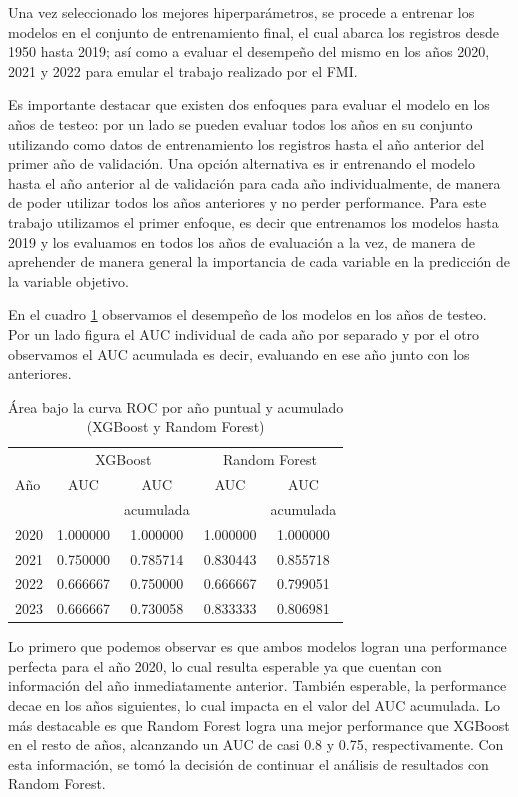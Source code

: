 \documentclass{article}
\begin{document}
Una vez seleccionado los mejores hiperparámetros, se procede a entrenar los modelos en el
conjunto de entrenamiento final, el cual abarca los registros desde 1950 hasta 2019; así
como a evaluar el desempeño del mismo en los años 2020, 2021 y 2022 para emular el trabajo
realizado por el FMI.

Es importante destacar que existen dos enfoques para evaluar el modelo en los años de
testeo: por un lado se pueden evaluar todos los años en su conjunto utilizando como datos
de entrenamiento los registros hasta el año anterior del primer año de validación. Una
opción alternativa es ir entrenando el modelo hasta el año anterior al de validación para
cada año individualmente, de manera de poder utilizar todos los años anteriores y no 
perder performance. Para este trabajo utilizamos el primer enfoque, es decir que entrenamos los 
modelos hasta 2019 y los evaluamos en todos los años de evaluación a la vez, de manera de
aprehender de manera general la importancia de cada variable en la predicción de la
variable objetivo.

En el cuadro \ref{tab:performance} observamos el desempeño de los modelos en los años
de testeo. Por un lado figura el AUC individual de cada año por separado y por el otro
observamos el AUC acumulada es decir, evaluando en ese año junto con los anteriores.

\begin{table}[H]
  \centering
    \begin{tabular}{lcccc}
      \toprule
      & \multicolumn{2}{c}{XGBoost} & \multicolumn{2}{c}{Random Forest} \\
      Año  & AUC      & AUC      & AUC      & AUC  \\
           &          & acumulada&          & acumulada \\
      \midrule
      2020 & 1.000000 & 1.000000 & 1.000000 & 1.000000 \\
      2021 & 0.750000 & 0.785714 & 0.830443 & 0.855718 \\
      2022 & 0.666667 & 0.750000 & 0.666667 & 0.799051 \\
      2023 & 0.666667 & 0.730058 & 0.833333 & 0.806981 \\

      \bottomrule
    \end{tabular}
  \caption{Área bajo la curva ROC por año puntual y acumulado (XGBoost y 
  Random Forest) \label{tab:performance}}
\end{table}

Lo primero que podemos observar es que ambos modelos logran una performance perfecta 
para el año 2020, lo cual resulta esperable ya que cuentan con información del año 
inmediatamente anterior. También esperable, la performance decae en los años siguientes, 
lo cual impacta en el valor del AUC acumulada. Lo más destacable es que Random 
Forest logra una mejor performance que XGBoost en el resto de años, alcanzando un AUC de 
casi 0.8 y 0.75, respectivamente. Con esta información, se tomó la decisión de continuar 
el análisis de resultados con Random Forest.
\end{document}
